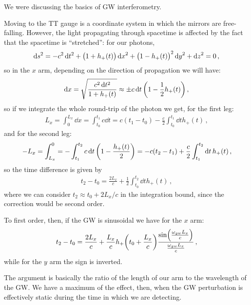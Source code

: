 \documentclass[main.tex]{subfiles}
\begin{document}

We were discussing the basics of GW interferometry.

Moving to the TT gauge is a coordinate system in which the mirrors are free-falling. 
However, the light propagating through spacetime is affected by the fact that the spacetime is ``stretched'': for our photons,
%
\begin{align}
\dd{s^2} = - c^2 \dd{t^2} + \qty(1 + h_{+} (t)) \dd{x}^2 + \qty(1 - h_{+}(t))^2 \dd{y}^2 + \dd{z}^2 = 0
\,,
\end{align}
%
so in the \(x\) arm, depending on the direction of propagation we will have: 
%
\begin{align}
\dd{x} = \sqrt{ \frac{c^2 \dd{t^2}}{1 + h_{+}(t)}}
\approx \pm c \dd{t} \qty(1 - \frac{1}{2} h_{+}(t))
\,,
\end{align}
%
so if we integrate the whole round-trip of the photon we get, for the first leg: 
%
\begin{align}
L_{x} = \int_{0}^{L_x} \dd{x} = \int_{t_0 }^{t_1 } c \dd{t} = c (t_1 - t_0 ) 
- \frac{c}{2} \int_{t_0 }^{t_1 } \dd{t} h_{+}(t) 
\,,
\end{align}
%
and for the second leg: 
%
\begin{align}
- L_x = \int_{L_x}^{0} = - \int_{t_1 }^{t_2 } c \dd{t} \qty(1 - \frac{h_{+}(t)}{2}) = - c (t_2 - t_1 ) + \frac{c}{2} \int_{t_1 }^{t_2 } \dd{t} h_{+}(t) 
\,,
\end{align}
%
so the time difference is given by 
%
\begin{align}
t_2 - t_0 = \frac{2L_x}{c} + \frac{1}{2} \int_{t_0 }^{t_2} \dd{t} h_{+}(t) 
\,,
\end{align}
%
where we can consider \(t_2 \approx t_0  + 2 L_x  /c\) in the integration bound, since the correction would be second order. 

To first order, then, if the GW is sinusoidal we have for the \(x\) arm:
%
\begin{align}
t_2 - t_0 = \frac{2L_x}{c} + \frac{L_x}{c} h_{+} \qty(t_0 + \frac{L_x}{c}) \frac{\sin(\frac{\omega_{gw} L_x}{c})}{\frac{\omega_{gw}L_x}{c}}
\,,
\end{align}
%
while for the \(y\) arm the sign is inverted. 

The argument is basically the ratio of the length of our arm to the wavelength of the GW. We have a maximum of the effect, then, when the GW perturbation is effectively static during the time in which we are detecting. 
\end{document}
